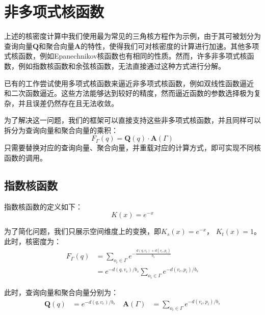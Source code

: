 \section{非多项式核函数}
\label{sec7:kernel}

上述的核密度计算中我们使用最为常见的三角核方程作为示例，由于其可被划分为查询向量$\mathbf{Q}$和聚合向量$\mathbf{A}$的特性，使得我们可对核密度的计算进行加速。其他多项式核函数，例如Epanechnikov核函数也有相同的性质。然而，许多非多项式核函数，例如指数核函数和余弦核函数，无法直接通过这种方式进行分解。

已有的工作尝试使用多项式核函数来逼近非多项式核函数，例如双线性函数逼近 \cite{chan_karl_2019} 和二次函数逼近\cite{chan_quad_2020}。这些方法能够达到较好的精度，然而逼近函数的参数选择极为复杂，并且误差仍然存在且无法收敛。

为了解决这一问题，我们的框架可以直接支持这些非多项式核函数，并且同样可以拆分为查询向量和聚合向量的乘积：
\begin{equation*}
	F_\Gamma(q)= \mathbf{Q}(q) \cdot \mathbf{A}(\Gamma)
\end{equation*}
只需要替换对应的查询向量、聚合向量，并重载对应的计算方式，即可实现不同核函数的调用。


\subsection{指数核函数}

指数核函数的定义如下：
\begin{equation*}
	K(x) = e^{-x}
\end{equation*}

为了简化问题，我们只展示空间维度上的变换，即$K_s(x) = e^{-x}$， $K_t(x) = 1$。此时，核密度为：
\begin{equation*}
\begin{aligned}
	F_{\Gamma}(q) &= \sum_{o_i \in \Gamma} e^{-\frac{d(q, v_c) + d(v_c, p_i)}{b_s}} \\
	&= e^{-d(q, v_c)/b_s} \sum_{o_i \in \Gamma} e^{-d(v_c, p_i)/b_s}
\end{aligned}
\end{equation*}

此时，查询向量和聚合向量分别为：
\begin{equation*}
\begin{aligned}
	\mathbf{Q}(q) &= e^{-d(q, v_c)/b_s} \quad
	\mathbf{A}(\Gamma) &= \sum_{o_i \in \Gamma} e^{-d(v_c, p_i)/b_s}
\end{aligned}
\end{equation*} 

